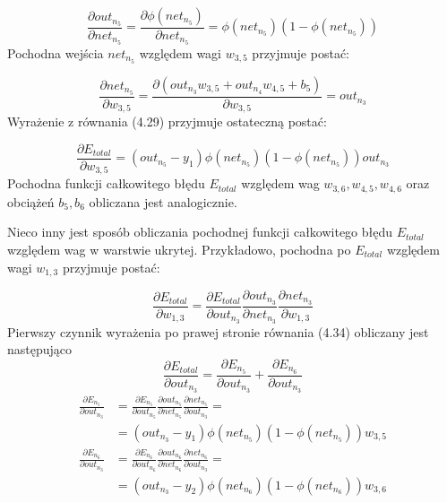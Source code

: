 \documentclass[notitlepage]{report}
\begin{document}
\begin{equation}
\frac{\partial out_{n_5}}{\partial net_{n_5}} = \frac{\partial \phi(net_{n_5})}{\partial net_{n_5}} = \phi (net_{n_5})(1 - \phi(net_{n_5}))
\end{equation}
Pochodna wejścia $net_{n_5}$ względem wagi $w_{3,5}$ przyjmuje postać:

\begin{equation}
\frac{\partial net_{n_5}}{\partial w_{3,5}} = \frac{\partial (out_{n_3}w_{3,5} + out_{n_4}w_{4,5} + b_5)}{\partial w_{3,5}} = out_{n_3}
\end{equation}
Wyrażenie z równania (4.29) przyjmuje ostateczną postać:

\begin{equation}
\frac{\partial E_{total}}{\partial w_{3,5}} = (out_{n_5} - y_1)\phi(net_{n_5})(1 - \phi(net_{n_5}))out_{n_3}
\end{equation}
Pochodna funkcji całkowitego błędu $E_{total}$ względem wag $w_{3,6}, w_{4,5}, w_{4,6}$ oraz obciążeń $b_5,b_6$ obliczana jest analogicznie. 

Nieco inny jest sposób obliczania pochodnej funkcji całkowitego błędu $E_{total}$ względem wag w warstwie ukrytej. Przykładowo, pochodna po $E_{total}$ względem wagi $w_{1,3}$ przyjmuje postać:

\begin{equation}
\frac{\partial E_{total}}{\partial w_{1,3}} = \frac{\partial E_{total}}{\partial out_{n_3}}\frac{\partial out_{n_3}}{\partial net_{n_3}}\frac{\partial net_{n_3}}{\partial w_{1,3}}
\end{equation}
Pierwszy czynnik wyrażenia po prawej stronie równania (4.34) obliczany jest następująco
\begin{equation}
\frac{\partial E_{total}}{\partial out_{n_3}} = \frac{\partial E_{n_5}}{\partial out_{n_3}} + \frac{\partial E_{n_6}}{\partial out_{n_3}} 
\end{equation}
\begin{equation}
\begin{split}
\frac{\partial E_{n_5}}{\partial out_{n_3}} & = \frac{\partial E_{n_5}}{\partial out_{n_5}}\frac{\partial out_{n_5}}{\partial net_{n_5}}\frac{\partial net_{n_5}}{\partial out_{n_3}} = \\ & =
(out_{n_3} - y_1)\phi(net_{n_5})(1 - \phi(net_{n_5}))w_{3,5}
\end{split}
\end{equation}
\begin{equation}
\begin{split}
\frac{\partial E_{n_6}}{\partial out_{n_3}} & = \frac{\partial E_{n_6}}{\partial out_{n_6}}\frac{\partial out_{n_6}}{\partial net_{n_6}}\frac{\partial net_{n_6}}{\partial out_{n_3}} = \\ & =
(out_{n_3} - y_2)\phi(net_{n_6})(1 - \phi(net_{n_6}))w_{3,6}
\end{split}
\end{equation}
\end{document}
